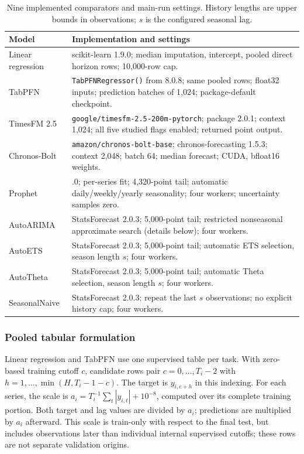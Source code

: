 \begin{table}[!htbp]
\centering\small
\caption{Nine implemented comparators and main-run settings. History lengths are upper bounds in observations; $s$ is the configured seasonal lag.}\label{tab:modelsettings}
\begin{tabular}{>{\raggedright\arraybackslash}p{.18\linewidth}>{\raggedright\arraybackslash}p{.73\linewidth}}\hline
Model & Implementation and settings \\\hline
Linear regression & scikit-learn 1.9.0; median imputation, intercept, pooled direct horizon rows; 10,000-row cap. \\
TabPFN & \texttt{TabPFNRegressor()} from 8.0.8; same pooled rows; float32 inputs; prediction batches of 1,024; package-default checkpoint. \\
TimesFM 2.5 & \texttt{google/timesfm-2.5-200m-pytorch}; package 2.0.1; context 1,024; all five studied flags enabled; returned point output. \\
Chronos-Bolt & \texttt{amazon/chronos-bolt-base}; chronos-forecasting 1.5.3; context 2,048; batch 64; median forecast; CUDA, bfloat16 weights. \\
Prophet & 1.3.0; per-series fit; 4,320-point tail; automatic daily/weekly/yearly seasonality; four workers; uncertainty samples zero. \\
AutoARIMA & StatsForecast 2.0.3; 5,000-point tail; restricted nonseasonal approximate search (details below); four workers. \\
AutoETS & StatsForecast 2.0.3; 5,000-point tail; automatic ETS selection, season length $s$; four workers. \\
AutoTheta & StatsForecast 2.0.3; 5,000-point tail; automatic Theta selection, season length $s$; four workers. \\
SeasonalNaive & StatsForecast 2.0.3; repeat the last $s$ observations; no explicit history cap; four workers. \\\hline
\end{tabular}
\end{table}

\subsubsection{Pooled tabular formulation}
Linear regression and TabPFN use one supervised table per task. With zero-based training cutoff $c$, candidate rows pair $c=0,\ldots,T_i-2$ with $h=1,\ldots,\min(H,T_i-1-c)$. The target is $y_{i,c+h}$ in this indexing. For each series, the scale is $a_i=T_i^{-1}\sum_t|y_{i,t}|+10^{-8}$, computed over its complete training portion. Both target and lag values are divided by $a_i$; predictions are multiplied by $a_i$ afterward. This scale is train-only with respect to the final test, but includes observations later than individual internal supervised cutoffs; these rows are not separate validation origins.

